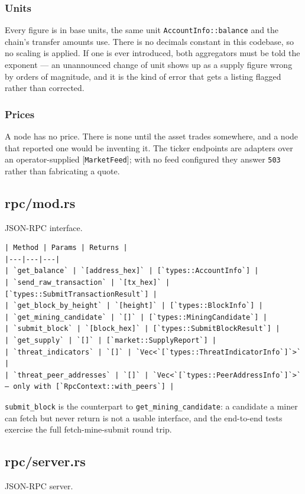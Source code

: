 \documentclass[11pt,a4paper]{article}
\begin{document}
\subsubsection{Units}

Every figure is in base units, the same unit \texttt{AccountInfo::balance} and the
chain's transfer amounts use. There is no decimals constant in this codebase,
so no scaling is applied. If one is ever introduced, both aggregators must be
told the exponent — an unannounced change of unit shows up as a supply figure
wrong by orders of magnitude, and it is the kind of error that gets a listing
flagged rather than corrected.

\subsubsection{Prices}

A node has no price. There is none until the asset trades somewhere, and a
node that reported one would be inventing it. The ticker endpoints are
adapters over an operator-supplied [\texttt{MarketFeed}]; with no feed configured
they answer \texttt{503} rather than fabricating a quote.

\subsection{rpc/mod.rs}
JSON-RPC interface.

\begin{verbatim}
| Method | Params | Returns |
|---|---|---|
| `get_balance` | `[address_hex]` | [`types::AccountInfo`] |
| `send_raw_transaction` | `[tx_hex]` | [`types::SubmitTransactionResult`] |
| `get_block_by_height` | `[height]` | [`types::BlockInfo`] |
| `get_mining_candidate` | `[]` | [`types::MiningCandidate`] |
| `submit_block` | `[block_hex]` | [`types::SubmitBlockResult`] |
| `get_supply` | `[]` | [`market::SupplyReport`] |
| `threat_indicators` | `[]` | `Vec<`[`types::ThreatIndicatorInfo`]`>` |
| `threat_peer_addresses` | `[]` | `Vec<`[`types::PeerAddressInfo`]`>` — only with [`RpcContext::with_peers`] |
\end{verbatim}

\texttt{submit\_block} is the counterpart to \texttt{get\_mining\_candidate}: a candidate a
miner can fetch but never return is not a usable interface, and the
end-to-end tests exercise the full fetch-mine-submit round trip.

\subsection{rpc/server.rs}
JSON-RPC server.
\end{document}
